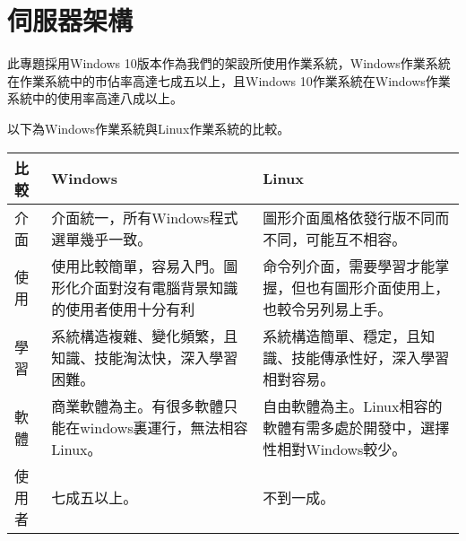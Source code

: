 \chapter{伺服器架構}
\renewcommand{\baselinestretch}{10} %
\par
\renewcommand{\baselinestretch}{1} %
\twelve 此專題採用Windows 10版本作為我們的架設所使用作業系統，Windows作業系統在作業系統中的市佔率高達七成五以上，且Windows 10作業系統在Windows作業系統中的使用率高達八成以上。
\\
\par
\renewcommand{\baselinestretch}{1} %
\twelve 以下為Windows作業系統與Linux作業系統的比較。
\par
\begin{center}
\begin{tabular}{|l|p{6.5cm}|p{6.5cm}|} %
\hline
比較&Windows&Linux 
\\
\hline
介面&介面統一，所有Windows程式選單幾乎一致。&圖形介面風格依發行版不同而不同，可能互不相容。
\\
\hline
使用&使用比較簡單，容易入門。圖形化介面對沒有電腦背景知識的使用者使用十分有利&命令列介面，需要學習才能掌握，但也有圖形介面使用上，也較令另列易上手。
\\
\hline
學習&系統構造複雜、變化頻繁，且知識、技能淘汰快，深入學習困難。&系統構造簡單、穩定，且知識、技能傳承性好，深入學習相對容易。
\\
\hline
軟體&商業軟體為主。有很多軟體只能在windows裏運行，無法相容Linux。&自由軟體為主。Linux相容的軟體有需多處於開發中，選擇性相對Windows較少。
\\
\hline
使用者&七成五以上。&不到一成。
\\
\hline
\end{tabular}
\end{center}
\par

\renewcommand{\baselinestretch}{20} %
